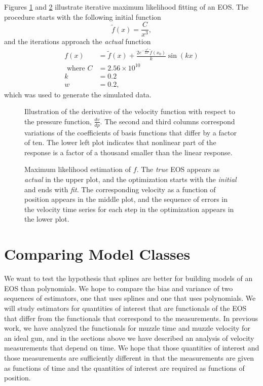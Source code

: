 \documentclass[11pt]{article}
\newcommand{\fnom}{\tilde f}
\begin{document}
\newcommand{\freq}{k} %
Figures \ref{fig:d} and \ref{fig:fve} illustrate iterative maximum
likelihood fitting of an EOS.  The procedure starts with the following
initial function
\begin{equation}
  \label{eq:initial}
  \fnom(x) = \frac{C}{x^3},
\end{equation}
and the iterations approach the \emph{actual} function
\begin{align}
  \label{eq:actual}
  f(x) &= \fnom(x) + \frac{2 e^{-\frac{x^2}{2w^2}}
         \fnom(x_0)}{\freq}  \sin(\freq x)\\
   \text{ where }C &= 2.56\times 10^{10} \nonumber \\
  \freq &= 0.2 \nonumber \\
  w &= 0.2, \nonumber
\end{align}
which was used to generate the simulated data.
\begin{figure}
  \centering
    \caption{Illustration of the derivative of the velocity function
      with respect to the pressure function, $\frac{d v}{d p}$.  The
      second and third columns correspond variations of the
      coefficients of basis functions that differ by a factor of ten.
      The lower left plot indicates that nonlinear part of the
      response is a factor of a thousand smaller than the linear
      response.  }
  \label{fig:d}
\end{figure}
\begin{figure}
  \centering
    \caption{Maximum likelihood estimation of $f$.  The \emph{true}
      EOS appears as \emph{actual} in the upper plot, and the
      optimization starts with the \emph{initial} and ends with
      \emph{fit}.  The corresponding velocity as a function of
      position appears in the middle plot, and the sequence of errors
      in the velocity time series for each step in the optimization
      appears in the lower plot. }
  \label{fig:fve}
\end{figure}

\section{Comparing Model Classes}
\label{sec:classes}

We want to test the hypothesis that splines are better for building
models of an EOS than polynomials.  We hope to compare the bias and
variance of two sequences of estimators, one that uses splines and one
that uses polynomials.  We will study estimators for quantities of
interest that are functionals of the EOS that differ from the
functionals that correspond to the measurements.  In previous work, we
have analyzed the functionals for muzzle time and muzzle velocity for
an ideal gun, and in the sections above we have described an analysis
of velocity measurements that depend on time.  We hope that those
quantities of interest and those measurements are sufficiently
different in that the measurements are given as functions of time and
the quantities of interest are required as functions of position.
\end{document}
